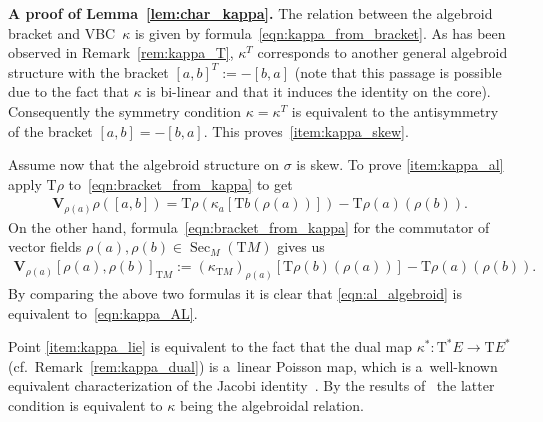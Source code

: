 \documentclass[10pt,a4paper]{amsart}
\newcommand{\ZM}{{VBC}} %
\newcommand{\Sec}{\operatorname{Sec}}
\newcommand{\V}{\mathbf{V}} %
\newcommand{\ra}{\rightarrow}
\newcommand{\T}{\mathrm{T}} %
\numberwithin{equation}{section}
\theoremstyle{definition}
\begin{document}
{\bf A proof of Lemma~\ref{lem:char_kappa}.} %
The relation between the algebroid bracket and \ZM\ $\kappa$ is given by formula~\eqref{eqn:kappa_from_bracket}. As has been observed in Remark~\ref{rem:kappa_T}, $\kappa^T$ corresponds to another general algebroid structure with the bracket $[a,b]^T:=-[b,a]$ (note that this passage is possible due to the fact that $\kappa$ is bi-linear and that it induces the identity on the core). Consequently the symmetry condition $\kappa=\kappa^T$ is equivalent to the antisymmetry of the bracket $[a,b]=-[b,a]$. This proves~\eqref{item:kappa_skew}.

Assume now that the algebroid structure on $\sigma$ is skew. To prove \eqref{item:kappa_al} apply $\T\rho$ to~\eqref{eqn:bracket_from_kappa} to get
\begin{gather*}\V_{\rho(a)}\rho([a,b])=\T\rho (\kappa_a [\T b(\rho(a)) ] )-\T \rho(a)(\rho(b)).\end{gather*}
On the other hand, formula~\eqref{eqn:bracket_from_kappa} for the commutator of vector fields $\rho(a),\rho(b)\in \Sec_M(\T M)$ gives us
\begin{gather*}\V_{\rho(a)}[\rho(a),\rho(b)]_{\T M}:=(\kappa_{\T M})_{\rho(a)} [\T\rho(b)(\rho(a)) ]-\T \rho(a)(\rho(b)).\end{gather*}
By comparing the above two formulas it is clear that \eqref{eqn:al_algebroid} is equivalent to~\eqref{eqn:kappa_AL}.

 Point \eqref{item:kappa_lie} is equivalent to the fact that the dual map $\kappa^\ast\colon \T^\ast E\ra \T E^\ast$ (cf.\ Remark~\ref{rem:kappa_dual}) is a~linear Poisson map, which is a~well-known equivalent characterization of the Jacobi identity~\cite{JG_PU_Algebroids_1999}. By the results of~\cite{JG_mod_class_skew_alg_rel_2012} the latter condition is equivalent to $\kappa$ being the algebroidal relation. %
\end{document}
